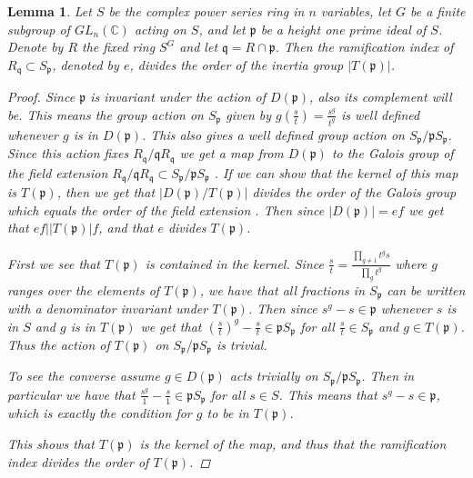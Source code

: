 \documentclass[11pt, a4paper, english]{article}
\newtheorem{lemma}[theorem]{Lemma}
\theoremstyle{definition}
\newcommand{\C}{\mathbb{C}}
\begin{document}
\begin{lemma}
Let $S$ be the complex power series ring in $n$ variables, let $G$ be  a finite subgroup of $GL_n(\C)$ acting on $S$, and let $\mathfrak{p}$ be a height one prime ideal of $S$. Denote by $R$ the fixed ring $S^G$ and let $\mathfrak{q} = R \cap \mathfrak{p}$. Then the ramification index of $R_\mathfrak{q} \subset S_\mathfrak{p}$, denoted by $e$, divides the order of the inertia group $|T(\mathfrak{p})|$.

\begin{proof}
Since $\mathfrak{p}$ is invariant under the action of $D(\mathfrak{p})$, also its complement will be. This means the group action on $S_\mathfrak{p}$ given by $g(\frac{s}{t}) = \frac{s^g}{t^g}$ is well defined whenever $g$ is in $D(\mathfrak{p})$. This also gives a well defined group action on $S_\mathfrak{p}/\mathfrak{p}S_\mathfrak{p}$. Since this action fixes $R_\mathfrak{q}/\mathfrak{q}R_\mathfrak{q}$ we get a map from $D(\mathfrak{p})$ to the Galois group of the field extension $R_\mathfrak{q}/\mathfrak{q}R_\mathfrak{q} \subset S_\mathfrak{p}/\mathfrak{p}S_\mathfrak{p}$ \cite[Theorem~7.1.1]{Cox12}. If we can show that the kernel of this map is $T(\mathfrak{p})$, then we get that $|D(\mathfrak{p})/T(\mathfrak{p})|$ divides the order of the Galois group which equals the order of the field extension \cite[Theorem~7.1.5]{Cox12}. Then since $|D(\mathfrak{p})| = ef$ we get that $ef \Big| |T(\mathfrak{p})|f$, and that $e$ divides $T(\mathfrak{p})$.

First we see that $T(\mathfrak{p})$ is contained in the kernel. Since $\frac{s}{t} = \frac{\prod_{g \neq 1}t^g s}{\prod_g t^g}$ where $g$ ranges over the elements of $T(\mathfrak{p})$, we have that all fractions in $S_\mathfrak{p}$ can be written with a denominator invariant under $T(\mathfrak{p})$. Then since $s^g - s \in \mathfrak{p}$ whenever $s$ is in $S$ and $g$ is in $T(\mathfrak{p})$ we get that $\left(\frac{s}{t}\right)^g - \frac{s}{t} \in \mathfrak{p}S_\mathfrak{p}$ for all $\frac{s}{t} \in S_\mathfrak{p}$ and $g \in T(\mathfrak{p})$. Thus the action of $T(\mathfrak{p})$ on $S_\mathfrak{p}/\mathfrak{p}S_\mathfrak{p}$ is trivial.

To see the converse assume $g \in D(\mathfrak{p})$ acts trivially on $S_\mathfrak{p}/\mathfrak{p}S_\mathfrak{p}$. Then in particular we have that $\frac{s^g}{1} - \frac{s}{1} \in \mathfrak{p}S_\mathfrak{p}$ for all $s \in S$. This means that $s^g - s \in \mathfrak{p}$, which is exactly the condition for $g$ to be in $T(\mathfrak{p})$.

This shows that $T(\mathfrak{p})$ is the kernel of the map, and thus that the ramification index divides the order of $T(\mathfrak{p})$.
\end{proof}
\end{lemma}
\end{document}
